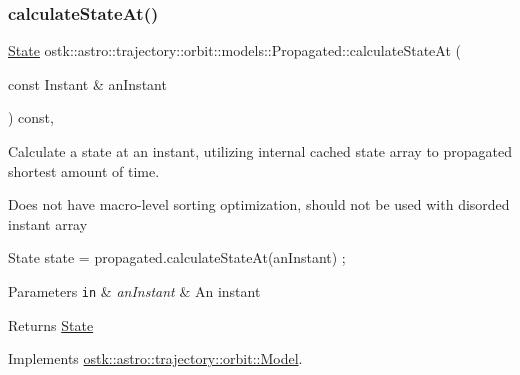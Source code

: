 \mbox{\label{classostk_1_1astro_1_1trajectory_1_1orbit_1_1models_1_1_propagated_a2efc3c1af735dcf2ec622d056fa0a13f}} 
\subsubsection{\texorpdfstring{calculate\+State\+At()}{calculateStateAt()}}
{\footnotesize\ttfamily \hyperlink{classostk_1_1astro_1_1trajectory_1_1_state}{State} ostk\+::astro\+::trajectory\+::orbit\+::models\+::\+Propagated\+::calculate\+State\+At (\begin{DoxyParamCaption}\item[{const Instant \&}]{an\+Instant }\end{DoxyParamCaption}) const\hspace{0.3cm}{\ttfamily [override]}, {\ttfamily [virtual]}}



Calculate a state at an instant, utilizing internal cached state array to propagated shortest amount of time. 

Does not have macro-\/level sorting optimization, should not be used with disorded instant array 
\begin{DoxyCode}
State state = propagated.calculateStateAt(anInstant) ;
\end{DoxyCode}
 
\begin{DoxyParams}[1]{Parameters}
\mbox{\tt in}  & {\em an\+Instant} & An instant \\
\hline
\end{DoxyParams}
\begin{DoxyReturn}{Returns}
\hyperlink{classostk_1_1astro_1_1trajectory_1_1_state}{State} 
\end{DoxyReturn}


Implements \hyperlink{classostk_1_1astro_1_1trajectory_1_1orbit_1_1_model_a34a0d8979ec1f7ade3e434fc0dad3711}{ostk\+::astro\+::trajectory\+::orbit\+::\+Model}.

\mbox{\label{classostk_1_1astro_1_1trajectory_1_1orbit_1_1models_1_1_propagated_a9a4097432d2c863aedead23d2d67a7a7}} 
